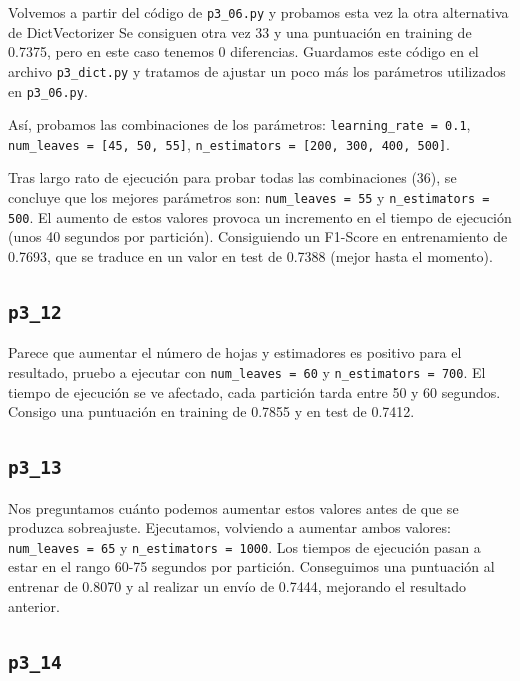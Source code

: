 \documentclass[a4paper, 20pt]{article}
\begin{document}
Volvemos a partir del código de \texttt{p3\_06.py} y probamos esta vez la otra alternativa de %
DictVectorizer %
Se consiguen otra vez 33 y una puntuación en training de 0.7375, pero en este caso tenemos 0 diferencias. Guardamos este código en el archivo \texttt{p3\_dict.py} y tratamos de ajustar un poco más los parámetros utilizados en \texttt{p3\_06.py}.

Así, probamos las combinaciones de los parámetros: \texttt{learning\_rate = 0.1}, \texttt{num\_leaves = [45, 50, 55]}, \texttt{n\_estimators = [200, 300, 400, 500]}.

Tras largo rato de ejecución para probar todas las combinaciones (36), se concluye que los mejores parámetros son: \texttt{num\_leaves = 55} y \texttt{n\_estimators = 500}. El aumento de estos valores provoca un incremento en el tiempo de ejecución (unos 40 segundos por partición). Consiguiendo un F1-Score en entrenamiento de 0.7693, que se traduce en un valor en test de 0.7388 (mejor hasta el momento).

\subsection{\texttt{p3\_12}}

Parece que aumentar el número de hojas y estimadores es positivo para el resultado, pruebo a ejecutar con \texttt{num\_leaves = 60} y \texttt{n\_estimators = 700}. El tiempo de ejecución se ve afectado, cada partición tarda entre 50 y 60 segundos. Consigo una puntuación en training de 0.7855 y en test de 0.7412.

\subsection{\texttt{p3\_13}}

Nos preguntamos cuánto podemos aumentar estos valores antes de que se produzca sobreajuste. Ejecutamos, volviendo a aumentar ambos valores:  \texttt{num\_leaves = 65} y \texttt{n\_estimators = 1000}. Los tiempos de ejecución pasan a estar en el rango 60-75 segundos por partición. Conseguimos una puntuación al entrenar de 0.8070 y al realizar un envío de 0.7444, mejorando el resultado anterior.

\subsection{\texttt{p3\_14}}
\end{document}
